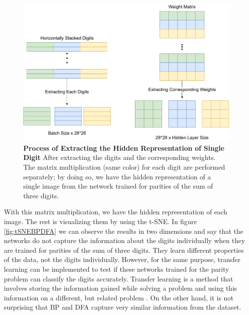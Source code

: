 \documentclass[a4paper, nobind]{templates/ociamthesis}
\begin{document}
\begin{figure}

{\centering \includegraphics[width=1\linewidth]{figures/B_hidden_rep_process} 

}

\caption[Process of Extracting the Hidden Representation of Single Digit ]{\textbf{Process of Extracting the Hidden Representation of Single Digit } \newline After extracting the digits and the corresponding weights. The matrix multiplication (same color) for each digit are performed separately; by doing so, we have the hidden representation of a single image from the network trained for parities of the sum of three digits.}\label{fig:HiddenRepProcess}
\end{figure}

\noindent With this matrix multiplication, we have the hidden representation of each image. The rest is visualizing them by using the t-SNE. In figure \ref{fig:tSNEBPDFA} we can observe the results in two dimensions and say that the networks do not capture the information about the digits individually when they are trained for parities of the sum of three digits. They learn different properties of the data, not the digits individually. However, for the same purpose, transfer learning can be implemented to test if these networks trained for the parity problem can classify the digits accurately. Transfer learning is a method that involves storing the information gained while solving a problem and using this information on a different, but related problem \cite{DBLP:journals/corr/JhaS15}. On the other hand, it is not surprising that BP and DFA capture very similar information from the dataset.
\end{document}
